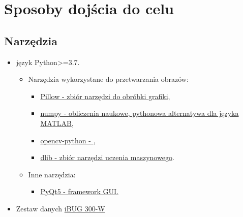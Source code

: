 \section{Sposoby dojścia do celu}

\subsection{Narzędzia}

\renewcommand\labelitemii{$\bullet$}
\renewcommand\labelitemiii{$\bullet$}

\begin{itemize}
    \item język Python>=3.7.
    \begin{itemize}
        \item Narzędzia wykorzystane do przetwarzania obrazów:
        \begin{itemize}     
            \item \href{https://pillow.readthedocs.io/en/stable/}{Pillow - zbiór narzędzi do obróbki grafiki},
            \item \href{https://numpy.org/}{numpy - obliczenia naukowe, pythonowa alternatywa dla języka MATLAB},
            \item \href{https://pypi.org/project/opencv-python/}{opencv-python - },
            \item \href{http://dlib.net/}{dlib - zbiór narzędzi uczenia maszynowego}.
        \end{itemize}   
        \item Inne narzędzia:
        \begin{itemize}
            \item \href{https://pypi.org/project/PyQt5/}{PyQt5 - framework GUI.}
        \end{itemize}
    \end{itemize}
    \item Zestaw danych \href{https://ibug.doc.ic.ac.uk/resources/300-W/}{iBUG 300-W}\cite{300-w}
\end{itemize}

